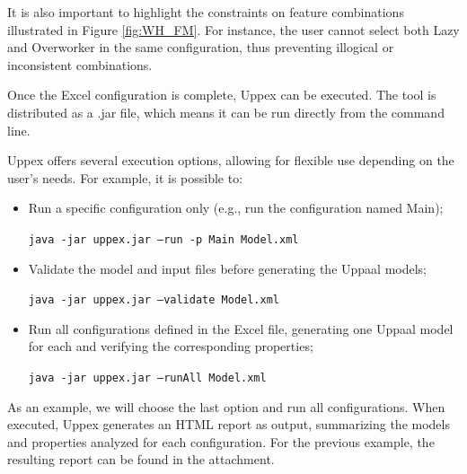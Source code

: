It is also important to highlight the constraints on feature combinations illustrated in Figure \ref{fig:WH_FM}. For instance, the user cannot select both Lazy and Overworker in the same configuration, thus preventing illogical or inconsistent combinations.

Once the Excel configuration is complete, Uppex can be executed. The tool is distributed as a .jar file, which means it can be run directly from the command line.

Uppex offers several execution options, allowing for flexible use depending on the user's needs. For example, it is possible to:

\begin{itemize}
    \item Run a specific configuration only (e.g., run the configuration named Main);

    \texttt{java -jar uppex.jar --run -p Main Model.xml}

    \item Validate the model and input files before generating the Uppaal models;
    
    \texttt{java -jar uppex.jar --validate Model.xml}
    
    \item Run all configurations defined in the Excel file, generating one Uppaal model for each and verifying the corresponding properties;
    
    \texttt{java -jar uppex.jar --runAll Model.xml}
\end{itemize}

As an example, we will choose the last option and run all configurations. When executed, Uppex generates an HTML report as output, summarizing the models and properties analyzed for each configuration. For the previous example, the resulting report can be found in the attachment.





